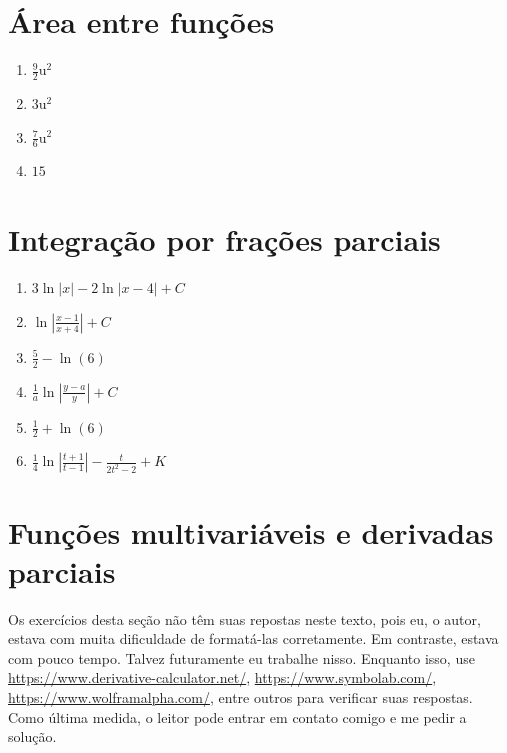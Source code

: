 \documentclass[a4paper, 12pt]{extreport}
\begin{document}
    \section*{Área entre funções}
      \begin{multicols}{4}
        \begin{enumerate}
          \item $\frac{9}{2}\mathrm{u^2}$
          \item $3\mathrm{u^2}$
          \item $\frac{7}{6}\mathrm{u^2}$
          \item $15$
        \end{enumerate}
      \end{multicols}

    \section*{Integração por frações parciais}
      \begin{multicols}{3}
        \begin{enumerate}
          \item $3\ln|x| - 2\ln|x-4| + C$
          \item $\ln\left|\frac{x-1}{x+4}\right| + C$
          \item $\frac{5}{2} - \ln(6)$
          \item $\frac{1}{a}\ln\left|\frac{y-a}{y}\right| + C$
          \item $\frac{1}{2} + \ln(6)$
          \item $\frac{1}{4}\ln\left|\frac{t+1}{t-1}\right|-\frac{t}{2t^2-2} + K$
        \end{enumerate}
      \end{multicols}

    \section*{Funções multivariáveis e derivadas parciais}
      Os exercícios desta seção não têm suas repostas neste texto, pois eu, o autor, estava com muita dificuldade de formatá-las corretamente. Em contraste,
      estava com pouco tempo. Talvez futuramente eu trabalhe nisso. Enquanto isso, use \url{https://www.derivative-calculator.net/},
      \url{https://www.symbolab.com/}, \url{https://www.wolframalpha.com/}, entre outros para verificar suas respostas. Como última medida, o leitor
      pode entrar em contato comigo e me pedir a solução.
\end{document}
